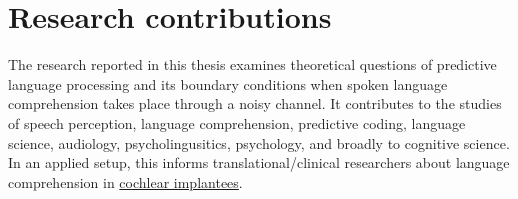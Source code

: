 \documentclass[a4paper, nobind]{templates/ociamthesis}
\begin{document}
\hypertarget{research-contributions}{%
\section{Research contributions}\label{research-contributions}}

The research reported in this thesis examines theoretical questions of predictive language processing and its boundary conditions when spoken language comprehension takes place through a noisy channel.
It contributes to the studies of speech perception, language comprehension, predictive coding, language science, audiology, psycholingusitics, psychology, and broadly to cognitive science.
In an applied setup, this informs translational/clinical researchers about language comprehension in \protect\hyperlink{distortion-degradation}{cochlear implantees}.
\end{document}
